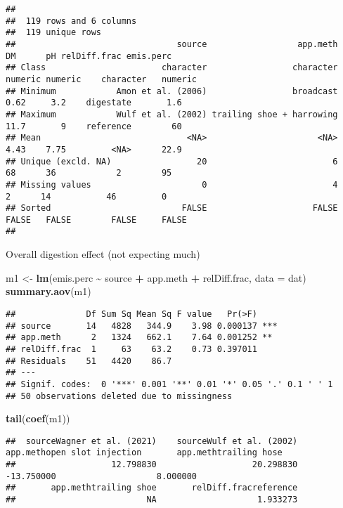 \documentclass[
]{article}
\newenvironment{Shaded}{\begin{snugshade}}{\end{snugshade}}
\newcommand{\AttributeTok}[1]{\textcolor[rgb]{0.13,0.29,0.53}{#1}}
\newcommand{\FunctionTok}[1]{\textcolor[rgb]{0.13,0.29,0.53}{\textbf{#1}}}
\newcommand{\NormalTok}[1]{#1}
\newcommand{\OtherTok}[1]{\textcolor[rgb]{0.56,0.35,0.01}{#1}}
\newcommand{\SpecialCharTok}[1]{\textcolor[rgb]{0.81,0.36,0.00}{\textbf{#1}}}
\begin{document}
\begin{verbatim}
## 
##  119 rows and 6 columns
##  119 unique rows
##                                source                  app.meth      DM      pH relDiff.frac emis.perc
## Class                       character                 character numeric numeric    character   numeric
## Minimum            Amon et al. (2006)                 broadcast    0.62     3.2    digestate       1.6
## Maximum            Wulf et al. (2002) trailing shoe + harrowing    11.7       9    reference        60
## Mean                             <NA>                      <NA>    4.43    7.75         <NA>      22.9
## Unique (excld. NA)                 20                         6      68      36            2        95
## Missing values                      0                         4       2      14           46         0
## Sorted                          FALSE                     FALSE   FALSE   FALSE        FALSE     FALSE
## 
\end{verbatim}

Overall digestion effect (not expecting much)

\begin{Shaded}
\begin{Highlighting}[]
\NormalTok{m1 }\OtherTok{\textless{}{-}} \FunctionTok{lm}\NormalTok{(emis.perc }\SpecialCharTok{\textasciitilde{}}\NormalTok{ source }\SpecialCharTok{+}\NormalTok{ app.meth }\SpecialCharTok{+}\NormalTok{ relDiff.frac, }\AttributeTok{data =}\NormalTok{ dat)}
\FunctionTok{summary.aov}\NormalTok{(m1)}
\end{Highlighting}
\end{Shaded}

\begin{verbatim}
##              Df Sum Sq Mean Sq F value   Pr(>F)    
## source       14   4828   344.9    3.98 0.000137 ***
## app.meth      2   1324   662.1    7.64 0.001252 ** 
## relDiff.frac  1     63    63.2    0.73 0.397011    
## Residuals    51   4420    86.7                     
## ---
## Signif. codes:  0 '***' 0.001 '**' 0.01 '*' 0.05 '.' 0.1 ' ' 1
## 50 observations deleted due to missingness
\end{verbatim}

\begin{Shaded}
\begin{Highlighting}[]
\FunctionTok{tail}\NormalTok{(}\FunctionTok{coef}\NormalTok{(m1))}
\end{Highlighting}
\end{Shaded}

\begin{verbatim}
##  sourceWagner et al. (2021)    sourceWulf et al. (2002) app.methopen slot injection       app.methtrailing hose 
##                   12.798830                   20.298830                  -13.750000                    8.000000 
##       app.methtrailing shoe       relDiff.fracreference 
##                          NA                    1.933273
\end{verbatim}
\end{document}

